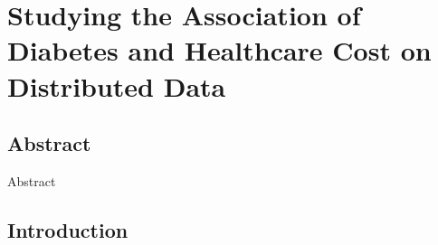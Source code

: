 \chapter{Studying the Association of Diabetes and Healthcare Cost on Distributed Data}
\clearpage

\begin{refsection}
\section*{Abstract}
Abstract
\section{Introduction}

\clearpage



\end{refsection}
